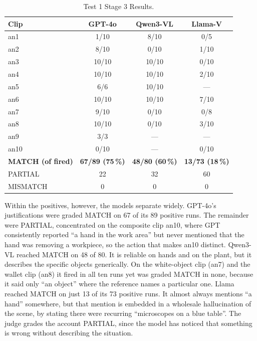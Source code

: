 \documentclass[11pt,a4paper]{article}
\begin{document}
\begin{table}[h]
\centering
\small
\setlength{\tabcolsep}{7pt}
\begin{tabular}{@{}l ccc@{}}
\toprule
Clip & GPT-4o & Qwen3-VL & Llama-V \\
\midrule
an1  & 1/10  & 8/10  & 0/5  \\
an2  & 8/10  & 0/10  & 1/10 \\
an3  & 10/10 & 10/10 & 0/10 \\
an4  & 10/10 & 10/10 & 2/10 \\
an5  & 6/6   & 10/10 & ---  \\
an6  & 10/10 & 10/10 & 7/10 \\
an7  & 9/10  & 0/10  & 0/8  \\
an8  & 10/10 & 0/10  & 3/10 \\
an9  & 3/3   & ---   & ---  \\
an10 & 0/10  & ---   & 0/10 \\
\midrule
\textbf{MATCH (of fired)} & \textbf{67/89 (75\,\%)} & \textbf{48/80 (60\,\%)}
                          & \textbf{13/73 (18\,\%)} \\
\midrule
PARTIAL   & 22 & 32 & 60 \\
MISMATCH  & 0  & 0  & 0 \\
\bottomrule
\end{tabular}
\caption{Test 1 Stage 3 Results.}
\label{tab:test1-stage3}
\end{table}
\FloatBarrier

Within the positives, however, the models separate widely. GPT-4o's
justifications were graded MATCH on 67 of its 89 positive runs. The
remainder were PARTIAL, concentrated on the composite clip an10, where GPT
consistently reported ``a hand in the work area'' but never mentioned that
the hand was removing a workpiece, so the action that makes an10 distinct.
Qwen3-VL reached MATCH on 48 of 80. It is reliable on hands and on the
plant, but it describes the specific objects generically. On the
white-object clip (an7) and the wallet clip (an8) it fired in all ten runs
yet was graded MATCH in none, because it said only ``an object'' where the
reference names a particular one. Llama reached MATCH on just 13 of its 73
positive runs. It almost always mentions ``a hand'' somewhere, but that
mention is embedded in a wholesale hallucination of the scene, by stating
there were recurring ``microscopes on a blue table''. The judge grades the
account PARTIAL, since the model has noticed that something is wrong
without describing the situation.
\end{document}
